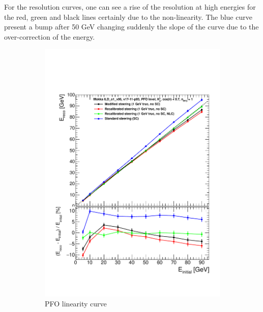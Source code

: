 For the resolution curves, one can see a rise of the resolution at high energies for the red, green and black lines certainly due to the non-linearity. The blue curve present a bump after 50 GeV changing suddenly the slope of the curve due to the over-correction of the energy.\\

\begin{figure}[htbp!]
  \centering
  \begin{subfigure}[t]{0.45\textwidth}
    \centering
    \includegraphics[width=1\linewidth]{chap6/fig_TimingILD/Comparison_linearity_Curves_PFO}
    \caption{PFO linearity curve} \label{fig:linpfo}
  \end{subfigure}
  \hfill
  \begin{subfigure}[t]{0.5\textwidth}
    \centering

\end{subfigure}
\end{figure}
